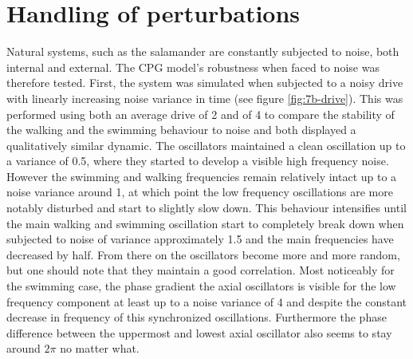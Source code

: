 \documentclass[a4paper]{scrartcl}
\begin{document}
\section{Handling of perturbations}
Natural systems, such as the salamander are constantly subjected to noise, both internal and external. The CPG model's robustness when faced to noise was therefore tested. First, the system was simulated when subjected to a noisy drive with linearly increasing noise variance in time (see figure \ref{fig:7b-drive}). This was performed using both an average drive of 2 and of 4 to compare the stability of the walking and the swimming behaviour to noise and both displayed a qualitatively similar dynamic. The oscillators maintained a clean oscillation up to a variance of 0.5, where they started to develop a visible high frequency noise. However the swimming and walking frequencies remain relatively intact up to a noise variance around 1, at which point the low frequency oscillations are more notably disturbed and start to slightly slow down. This behaviour intensifies until the main walking and swimming oscillation start to completely break down when subjected to noise of variance approximately 1.5 and the main frequencies have decreased by half. From there on the oscillators become more and more random, but one should note that they maintain a good correlation. Most noticeably for the swimming case, the phase gradient the axial oscillators is visible for the low frequency component at least up to a noise variance of 4 and despite the constant decrease in frequency of this synchronized oscillations. Furthermore the phase difference between the uppermost and lowest axial oscillator also seems to stay around $2\pi$ no matter what. 
\end{document}
